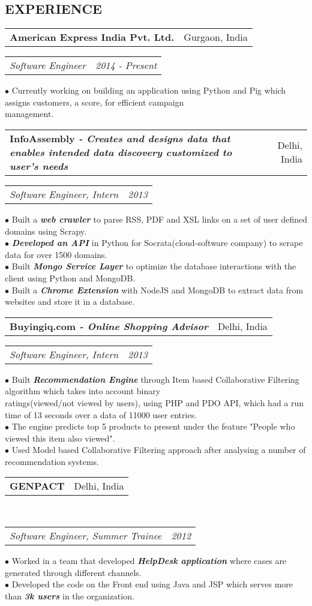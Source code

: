 \documentclass[10.5pt]{article}
\makeatletter
\newcommand{\headerrow}[2]
{\begin{tabular*}{\linewidth}{l@{\extracolsep{\fill}}r}
	#1 &
	#2 \\
\end{tabular*}}
\makeatother
\begin{document}
\subsection*{EXPERIENCE}
\vspace{-3pt}
\headerrow
		{\textbf{American Express India Pvt. Ltd.}}
		{Gurgaon, India}
	\headerrow
		{\emph{Software Engineer}}
		{\emph{2014 - Present}}
$\bullet$ Currently working on building an application using Python and Pig which assigns customers, a score, for efficient campaign 
\\\hspace*{2.5mm}management. 
\\[0.06in]
	\headerrow
		{\textbf{InfoAssembly {\it  - Creates and designs data that enables intended data discovery customized to user's needs}}}
		{Delhi, India}
	\headerrow
		{\emph{Software Engineer, Intern}}
		{\emph{2013}}
$\bullet$ Built a {\it {\bf web crawler }} to parse RSS, PDF and XSL links on a set of user defined domains using Scrapy. 
\\
$\bullet$ {\it {\bf Developed an API }} in Python for Socrata(cloud-software company) to scrape data for over 1500 domains.
\\
$\bullet$ Built  {\it {\bf Mongo Service Layer }} to optimize the database interactions with the client using Python and MongoDB. 
\\
$\bullet$ Built a  {\it {\bf Chrome Extension }} with NodeJS and MongoDB to extract data from websites and store it in a  database.
\\[0.06in]
\headerrow
		{\textbf{Buyingiq.com {\it -  Online Shopping Advisor}}}
		{Delhi, India}
	\headerrow
		{\emph{Software Engineer, Intern}}
		{\emph{2013}}
$\bullet$ Built {\it {\bf Recommendation Engine}} through Item based Collaborative Filtering algorithm which takes into account binary 
\\\hspace*{2.5mm}ratings(viewed/not viewed by users), using PHP and PDO API, which had a run time of 13 seconds over a data of 11000 user entries.
\\
$\bullet$ The engine  predicts  top 5 products to present under the feature "People who viewed this item also viewed".
\\
$\bullet$ Used Model based Collaborative Filtering approach after analysing a number of recommendation systems.
\\[0.06in]
	\headerrow
		{\textbf{GENPACT}}
		{Delhi, India}
	\\
	\headerrow
	        {\emph{Software Engineer, Summer Trainee}}
		{\emph{2012}}
$\bullet$ Worked in a team that developed {\it {\bf HelpDesk application}} where cases are generated through different channels.
\\
$\bullet$ Developed the code on the Front end using Java and JSP which serves more than  {\it {\bf  3k users }} in the organization. 
\end{document}
